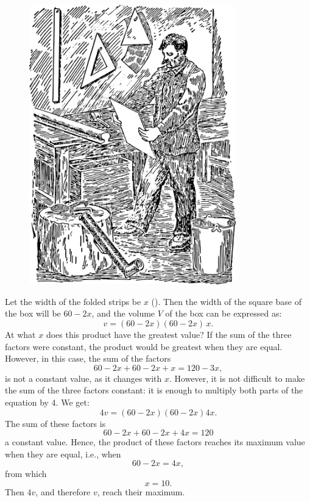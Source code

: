 \begin{figure}[h!]
\centering
\includegraphics[width=0.8\textwidth]{figures/ch-12/fig-183.pdf}
\end{figure}



\ans Let the width of the folded strips be $x$ (). Then the width of the square base of the box will be $60 - 2x$, and the volume $V$ of the box can be expressed as:
\begin{equation*}%
v = (60 - 2x)(60 - 2x)\, x.
\end{equation*}
At what $x$ does this product have the greatest value? If the sum of the three factors were constant, the product would be greatest when they are equal. However, in this case, the sum of the factors
\begin{equation*}%
60 - 2x + 60 - 2x + x = 120 - 3x,
\end{equation*}
is not a constant value, as it changes with $x$. However, it is not difficult to make the sum of the three factors constant: it is enough to multiply both parts of the equation by 4. We get:
\begin{equation*}%
4v = (60 - 2x)(60 - 2x)4x.
\end{equation*}
The sum of these factors is
\begin{equation*}%
60 - 2x + 60 - 2x + 4x = 120
\end{equation*}
a constant value. Hence, the product of these factors reaches its maximum value when they are equal, i.e., when
\begin{equation*}%
60 - 2x = 4x,
\end{equation*}
from which 
\begin{equation*}%
x = 10.
\end{equation*}
Then \(4v \), and therefore \(v \), reach their maximum.

